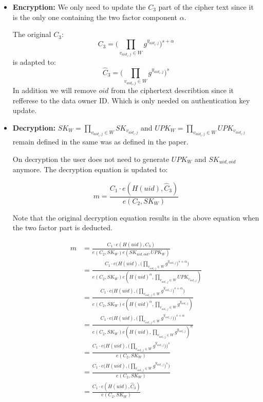 \begin{itemize}
\item \textbf{Encryption:} 
We only need to update the $C_3$ part of the cipher text since it is the only one containing the two factor component $\alpha$.

The original $C_3$:
$$
C_3 = \Big( \prod_{v_{aid_{i}, j}\in W} g^{y_{aid_{i}, j}} \Big)^{s + \alpha} 
$$
is adapted to:
$$
\widehat{C}_3 = \Big( \prod_{v_{aid_{i}, j}\in W} g^{y_{aid_{i}, j}} \Big)^s
$$ 
In addition we will remove $oid$ from the ciphertext describtion since it refferese to the data owner ID. Which is only needed on authentication key update.

\item \textbf{Decryption:}
$SK_W = \prod_{v_{aid_i,j} \in W} SK_{v_{aid_i,j}}$ and $UPK_W = \prod_{v_{aid_i,j} \in W} UPK_{v_{aid_i,j}}$ remain defined in the same was as defined in the paper. 

On decryption the user does not need to generate $UPK_W$ and $SK_{uid, oid}$ anymore. The decryption equation is updated to:

$$
m = \frac{C_1 \cdotp e(H(uid), \widehat{C}_3)}{e(C_2, SK_W)}
$$

Note that the original decryption equation results in the above equation when the two factor part is deducted.

\begin{equation}
\begin{split}
m &= \frac{C_1 \cdotp e(H(uid), C_3)}{e(C_2, SK_W)e(SK_{uid, oid}, UPK_W)} \\
  &= \frac{C_1 \cdotp e\Big(H(uid), \Big( \prod_{v_{aid_{i}, j}\in W} g^{y_{aid_{i}, j}} \Big)^{s + \alpha} \Big)}{e(C_2, SK_W)e(H(uid)^\alpha, \prod_{v_{aid_i,j} \in W} UPK_{v_{aid_i,j}})} \\
  &= \frac{C_1 \cdotp e\Big(H(uid), \Big( \prod_{v_{aid_{i}, j}\in W} g^{y_{aid_{i}, j}} \Big)^{s + \alpha} \Big)}{e(C_2, SK_W)e(H(uid)^\alpha, \prod_{v_{aid_i,j} \in W} g^{y_{aid_i,j}})} \\
  &= \frac{C_1 \cdotp e\Big(H(uid), \Big( \prod_{v_{aid_{i}, j}\in W} g^{y_{aid_{i}, j}} \Big) \Big)^{s + \alpha}}{e(C_2, SK_W)e(H(uid), \prod_{v_{aid_i,j} \in W} g^{y_{aid_i,j}})^\alpha} \\
  &= \frac{C_1 \cdotp e\Big(H(uid), \Big( \prod_{v_{aid_{i}, j}\in W} g^{y_{aid_{i}, j}} \Big) \Big)^{s}}{e(C_2, SK_W)} \\
  &= \frac{C_1 \cdotp e\Big(H(uid), \Big( \prod_{v_{aid_{i}, j}\in W} g^{y_{aid_{i}, j}} \Big)^{s} \Big)}{e(C_2, SK_W)} \\
  &= \frac{C_1 \cdotp e(H(uid), \widehat{C}_3)}{e(C_2, SK_W)}
\end{split}
\label{eq:2faRemoval}
\end{equation}


\end{itemize}
